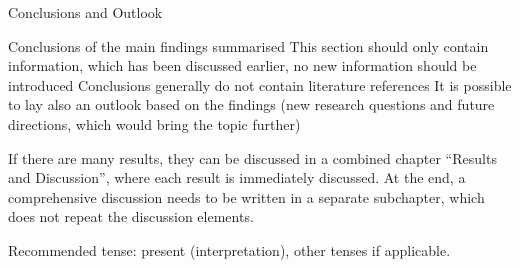Conclusions and Outlook

    Conclusions of the main findings summarised
    This section should only contain information, which has been discussed earlier, no new information should be introduced
    Conclusions generally do not contain literature references
    It is possible to lay also an outlook based on the findings (new research questions and future directions, which would bring the topic further)

If there are many results, they can be discussed in a combined chapter “Results and Discussion”, where each result is immediately discussed. At the end, a comprehensive discussion needs to be written in a separate subchapter, which does not repeat the discussion elements.

Recommended tense: present (interpretation), other tenses if applicable.
